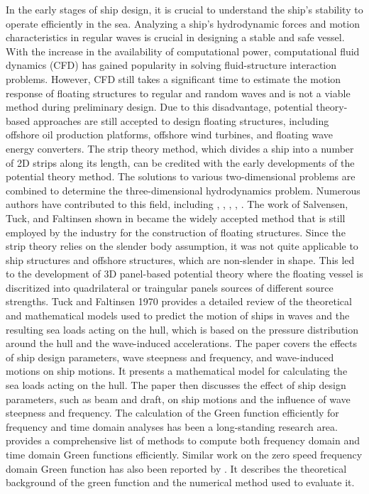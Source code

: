 In the early stages of ship design, it is crucial to understand the ship's stability to operate efficiently in the sea. Analyzing a ship's hydrodynamic forces and motion characteristics in regular waves is crucial in  designing a stable and safe vessel. With the increase in the availability of computational power, computational fluid dynamics (CFD) has gained popularity in solving fluid-structure interaction problems. However, CFD still takes a significant time to estimate the motion response of floating structures to regular and random waves and is not a viable method during preliminary design. Due to this disadvantage, potential theory-based approaches are still accepted to design floating structures, including offshore oil production platforms, offshore wind turbines, and floating wave energy converters.
The strip theory method, which divides a ship into a number of 2D strips along its length, can be credited with the early developments of the potential theory method. The solutions to various two-dimensional problems are combined to determine the three-dimensional hydrodynamics problem. Numerous authors have contributed to this field, including \cite{newman1979theory}, \cite{ogilvie1969rational}, \cite{beck1990documentation}, \cite{journee2001theoretical}, \cite{salvesen1970ship}. The work of Salvensen, Tuck, and Faltinsen shown in \cite{salvesen1970ship} became the widely accepted method that is still employed by the industry for the construction of floating structures. Since the strip theory relies on the slender body assumption, it was not quite applicable to ship structures and offshore structures, which are non-slender in shape. This led to the development of 3D panel-based potential theory where the floating vessel is discritized into quadrilateral or traingular panels sources of different source strengths.
Tuck and Faltinsen 1970 \cite{salvesen1970ship} provides a detailed review of the theoretical and mathematical models used to predict the motion of ships in waves and the resulting sea loads acting on the hull, which is based on the pressure distribution around the hull and the wave-induced accelerations. The paper covers the effects of ship design parameters, wave steepness and frequency, and wave-induced motions on ship motions. It presents a mathematical model for calculating the sea loads acting on the hull. The paper then discusses the effect of ship design parameters, such as beam and draft, on ship motions and the influence of wave steepness and frequency.
The calculation of the Green function efficiently for frequency and time domain analyses has been a long-standing research area. \cite{newman1979theory} provides a comprehensive list of methods to compute both frequency domain and time domain Green functions efficiently. Similar work on the zero speed frequency domain Green function has also been reported by \cite{telste1986numerical}. It describes the theoretical background of the green function and the numerical method used to evaluate it.

